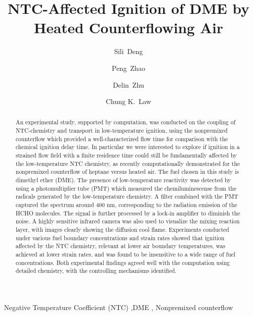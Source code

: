 \documentclass[review,3p,times]{elsarticleUS}
\begin{document}
\begin{frontmatter}

\title{NTC-Affected Ignition of DME by Heated Counterflowing Air}

\author{Sili~Deng}
\author{Peng~Zhao}
\author{Delin~Zhu}
\author{Chung K.~Law}

\address{Department of Mechanical and Aerospace Engineering, Princeton University, Princeton, NJ 08544, USA}


\begin{abstract}
An experimental study, supported by computation, was conducted on the coupling of NTC-chemistry and transport in low-temperature ignition, using the nonpremixed counterflow which provided a well-characterized flow time for comparison with the chemical ignition delay time.  In particular we were interested to explore if ignition in a strained flow field with a finite residence time could still be fundamentally affected by the low-temperature NTC chemistry, as recently computationally demonstrated for the nonpremixed counterflow of heptane versus heated air. The fuel chosen in this study is dimethyl ether (DME). The presence of low-temperature reactivity was detected by using a photomultiplier tube (PMT) which measured the chemiluminescense from the radicals generated by the low-temperature chemistry. A filter combined with the PMT captured the spectrum around 400 nm, corresponding to the radiation emission of the HCHO molecules. The signal is further processed by a lock-in amplifier to diminish the noise. A highly sensitive infrared camera was also used to visualize the mixing reaction layer, with images clearly showing the diffusion cool flame. Experiments conducted under various fuel boundary concentrations and strain rates showed that ignition affected by the NTC chemistry, relevant at lower air boundary temperatures, was achieved at lower strain rates, and was found to be insensitive to a wide range of fuel concentrations. Both experimental findings agreed well with the computation using detailed chemistry, with the controlling mechanisms identified.
\end{abstract}

\begin{keyword} 
Negative Temperature Coefficient (NTC) \sep DME \sep
Nonpremixed counterflow
\end{keyword}

\end{frontmatter}
\end{document}
